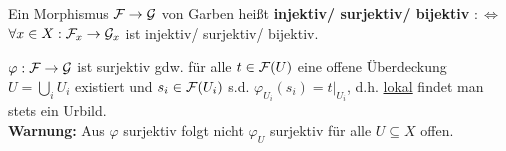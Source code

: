 \begin{defn}
\label{def:injektive-und-surjektive-garbenmorphismen}
Ein Morphismus $\mathcal{F} \to \mathcal{G}$ von Garben heißt \textbf{injektiv/ surjektiv/ bijektiv} $:\iff$ $\forall x \in X: \mathcal{F}_x \to \mathcal{G}_x$ ist injektiv/ surjektiv/ bijektiv.
\end{defn}

\begin{rem}
\label{rem:charakterisierung-surjektiv}
$\varphi : \mathcal{F} \to \mathcal{G}$ ist surjektiv gdw. für alle $t \in \mathcal{F}(U)$ eine offene Überdeckung $U = \bigcup_i U_i$ existiert und $s_i \in \mathcal{F}(U_i)$ s.d. $\varphi_{U_i}(s_i) = t|_{U_i}$, d.h. \underline{lokal} findet man stets ein Urbild.\\
\textbf{Warnung:} Aus $\varphi$ surjektiv folgt nicht $\varphi_U$ surjektiv für alle $U \subseteq X$ offen.	
\end{rem}